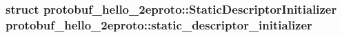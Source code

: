 \subsubsection[{\texorpdfstring{static\+\_\+descriptor\+\_\+initializer}{static_descriptor_initializer}}]{\setlength{\rightskip}{0pt plus 5cm}struct {\bf protobuf\+\_\+hello\+\_\+2eproto\+::\+Static\+Descriptor\+Initializer}  protobuf\+\_\+hello\+\_\+2eproto\+::static\+\_\+descriptor\+\_\+initializer}\hypertarget{namespaceprotobuf__hello__2eproto_ac38fa2048bc2c0b789234c37ea845a41}{}\label{namespaceprotobuf__hello__2eproto_ac38fa2048bc2c0b789234c37ea845a41}

